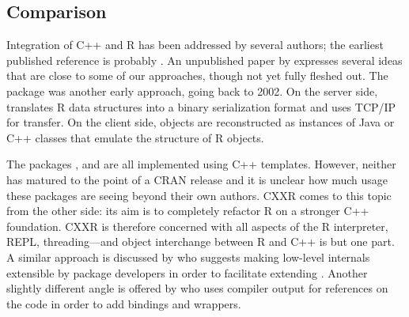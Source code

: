 \subsection{Comparison}

Integration of C++ and R has been addressed by several authors; the earliest
published reference is probably \cite{batesdebroy01:cppclasses}.
An unpublished paper by \cite{javagailemanly07:r_cpp} expresses several ideas
that are close to some of our approaches, though not yet fully fleshed out.
%
The  package \citep{urbanek2003:rserve,cran:Rserve} was another early approach,
going back to 2002. On the server side,  translates R data
structures into a binary serialization format and uses TCP/IP for
transfer. On the client side, objects are reconstructed as instances of Java
or C++ classes that emulate the structure of R objects. 

The packages  \citep{liang08:rcppbind}, 
\citep{armstrong09:RAbstraction} and 
\citep{armstrong09:RObjects} are all implemented using C++ templates.
However, neither has matured to the point of a CRAN release and it is
unclear how much usage these packages are seeing beyond their own authors.
%
CXXR \citep{runnalls09:cxxr} comes to this topic from the other side: 
its aim is to completely refactor R on a stronger C++ foundation. 
CXXR is therefore concerned with all aspects of the R interpreter,
REPL, threading---and object interchange between R and C++ is but one
part. A similar approach is discussed by \cite{templelang09:modestproposal}
who suggests making low-level internals extensible by package developers in
order to facilitate extending \R.
%
Another slightly different angle is offered by
\cite{templelang09:rgcctranslationunit} who uses compiler output for
references on the code in order to add bindings and wrappers.
%



